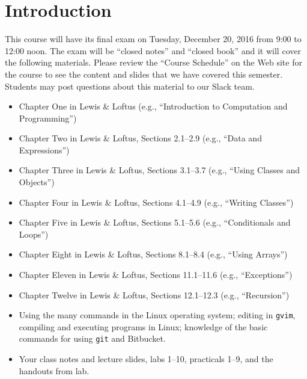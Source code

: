 


\vspace*{-.15in}

\section*{Introduction}

This course will have its final exam on Tuesday, December 20, 2016 from 9:00 to 12:00 noon. The exam will be ``closed
notes'' and ``closed book'' and it will cover the following materials. Please review the ``Course Schedule'' on the Web
site for the course to see the content and slides that we have covered this semester. Students may post questions about
this material to our Slack team.

\begin{itemize}

  \itemsep 0in

  \item Chapter One in Lewis \& Loftus (e.g., ``Introduction to Computation and Programming'')

  \item Chapter Two in Lewis \& Loftus, Sections 2.1--2.9 (e.g., ``Data and Expressions'')

  \item Chapter Three in Lewis \& Loftus, Sections 3.1--3.7 (e.g., ``Using Classes and Objects'')

  \item Chapter Four in Lewis \& Loftus, Sections 4.1--4.9 (e.g., ``Writing Classes'')

  \item Chapter Five in Lewis \& Loftus, Sections 5.1--5.6 (e.g., ``Conditionals and Loops'')

  \item Chapter Eight in Lewis \& Loftus, Sections 8.1--8.4 (e.g., ``Using Arrays'')

  \item Chapter Eleven in Lewis \& Loftus, Sections 11.1--11.6 (e.g., ``Exceptions'')

  \item Chapter Twelve in Lewis \& Loftus, Sections 12.1--12.3 (e.g., ``Recursion'')

  \item Using the many commands in the Linux operating system; editing in {\tt gvim}, compiling and executing
    programs in Linux; knowledge of the basic commands for using {\tt git} and Bitbucket.

  \item Your class notes and lecture slides, labs 1--10, practicals 1--9, and the handouts from lab.

\end{itemize}

